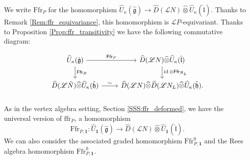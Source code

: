 \documentclass{amsart}
\theoremstyle{definition}
\newcommand{\sss}{\subsubsection{}}
\newcommand{\g}{\mathfrak{g}}
\newcommand{\h}{\mathfrak{h}}
\newcommand{\ffr}{\mathrm{ffr}}
\newcommand{\lf}{\mathfrak{l}}
\newcommand{\Loop}{\mathscr{L}}
\newcommand{\bone}{\mathbf{1}}
\newcommand{\Ffr}{\mathrm{{Ffr}}}
\numberwithin{equation}{section}
\begin{document}
\sss\label{SSS_ffr_univ_enveloping} We  write $\Ffr_P$ for the homomorphism 
$\widehat{U}_\kappa(\hat{\g})\rightarrow \widehat{D}(\Loop N)\widehat{\otimes} \widehat{U}_\kappa(\hat{\lf})$. Thanks to Remark 
\ref{Rem:ffr_equivariance}, this homomorphism is $\Loop P$-equivariant. Thanks to Proposition \ref{Prop:ffr_transitivity} we have the following commutative diagram:

\begin{equation}\label{eq:ffr_transitivity_algebra}
\begin{tikzcd}
\widehat{U}_\kappa(\hat{\g}) \arrow{r}{\mathsf{Ffr}_P} \arrow{d}{\mathsf{Ffr}_B}
& \widehat{D}(\Loop N) \widehat{\otimes} \widehat{U}_{\kappa}(\hat{\lf}) \arrow{d}{\operatorname{id}\otimes \mathsf{Ffr}_{B_L}} \\
\widehat{D}(\Loop\tilde{N}) \widehat{\otimes} \widehat{U}_{\kappa}(\hat{\h}) \arrow{r}{\sim} & \widehat{D}(\Loop N) \widehat{\otimes} \widehat{D}(\Loop N_L)\widehat{\otimes} \widehat{U}_{\kappa}(\hat{\h}).  
\end{tikzcd}
\end{equation}

\sss\label{SSS_ffr_un} As in the vertex algebra setting, Section \ref{SSS:ffr_deformed}, we have the universal version of $\ffr_P$, a homomorphism 
$$\Ffr_{P,\bone}:\widehat{U}_{\bone}(\hat{\g})\rightarrow \widehat{D}(\Loop N)\widehat{\otimes} \widehat{U}_{\bone}(\hat{\lf}).$$
We can also consider the associated graded homomorphism 
$\Ffr_{P,\bone}^0$ and the Rees algebra homomorphism $\Ffr_{P,\bone}^\hbar$.




%
%
\end{document}
